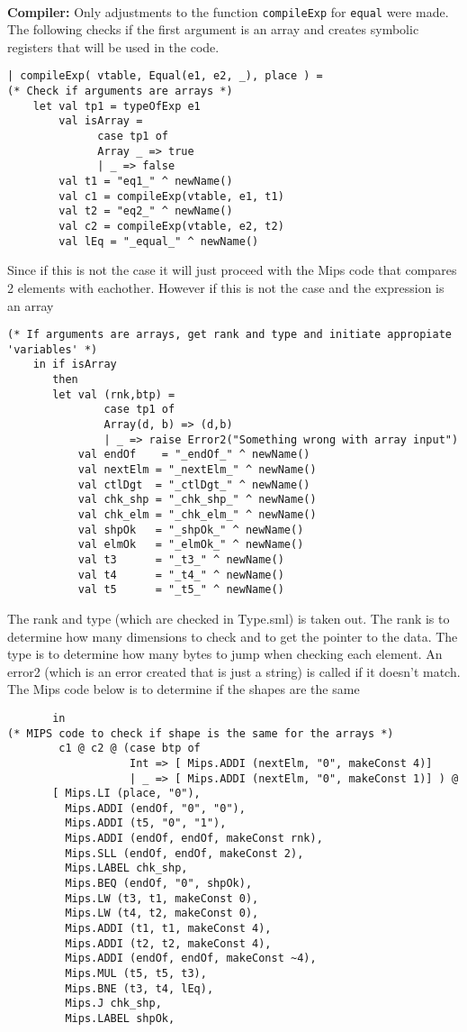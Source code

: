 \documentclass[12pt]{article}
\begin{document}
\\
\textbf{Compiler:} Only adjustments to the function \texttt{compileExp} for \texttt{equal} were made. The following checks if the first argument is an array and creates symbolic registers that will be used in the code.
\begingroup
    \fontsize{9pt}{12pt}\selectfont
    \begin{verbatim}  
| compileExp( vtable, Equal(e1, e2, _), place ) =
(* Check if arguments are arrays *)
    let val tp1 = typeOfExp e1
        val isArray = 
              case tp1 of
              Array _ => true
              | _ => false
        val t1 = "eq1_" ^ newName()
        val c1 = compileExp(vtable, e1, t1)
        val t2 = "eq2_" ^ newName()
        val c2 = compileExp(vtable, e2, t2)
        val lEq = "_equal_" ^ newName()

    \end{verbatim}  
\endgroup
Since if this is not the case it will just proceed with the Mips code that compares 2 elements with eachother. However if this is not the case and the expression is an array
\begingroup
    \fontsize{9pt}{12pt}\selectfont
    \begin{verbatim}
(* If arguments are arrays, get rank and type and initiate appropiate 'variables' *)
    in if isArray
       then
       let val (rnk,btp) = 
               case tp1 of
               Array(d, b) => (d,b)
               | _ => raise Error2("Something wrong with array input")
           val endOf    = "_endOf_" ^ newName()
           val nextElm = "_nextElm_" ^ newName()
           val ctlDgt  = "_ctlDgt_" ^ newName()
           val chk_shp = "_chk_shp_" ^ newName()
           val chk_elm = "_chk_elm_" ^ newName()
           val shpOk   = "_shpOk_" ^ newName()
           val elmOk   = "_elmOk_" ^ newName()
           val t3      = "_t3_" ^ newName()
           val t4      = "_t4_" ^ newName()
           val t5      = "_t5_" ^ newName()
    \end{verbatim}  
\endgroup
The rank and type (which are checked in Type.sml) is taken out. The rank is to determine how many dimensions to check and to get the pointer to the data. The type is to determine how many bytes to jump when checking each element. An error2 (which is an error created that is just a string) is called if it doesn't match. The Mips code below is to determine if the shapes are the same
\begingroup
    \fontsize{9pt}{12pt}\selectfont
    \begin{verbatim}
       in
(* MIPS code to check if shape is the same for the arrays *)
        c1 @ c2 @ (case btp of 
                   Int => [ Mips.ADDI (nextElm, "0", makeConst 4)]
                   | _ => [ Mips.ADDI (nextElm, "0", makeConst 1)] ) @
       [ Mips.LI (place, "0"),
         Mips.ADDI (endOf, "0", "0"),
         Mips.ADDI (t5, "0", "1"),
         Mips.ADDI (endOf, endOf, makeConst rnk),
         Mips.SLL (endOf, endOf, makeConst 2),
         Mips.LABEL chk_shp,
         Mips.BEQ (endOf, "0", shpOk),
         Mips.LW (t3, t1, makeConst 0),
         Mips.LW (t4, t2, makeConst 0),
         Mips.ADDI (t1, t1, makeConst 4),
         Mips.ADDI (t2, t2, makeConst 4),
         Mips.ADDI (endOf, endOf, makeConst ~4),
         Mips.MUL (t5, t5, t3),
         Mips.BNE (t3, t4, lEq),
         Mips.J chk_shp,
         Mips.LABEL shpOk,
    \end{verbatim}
\end{document}
